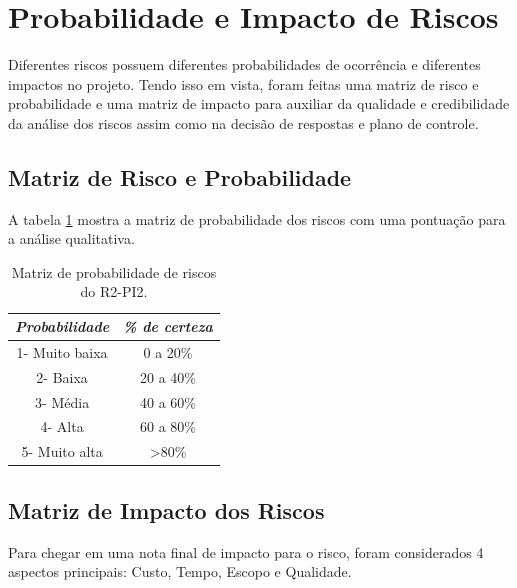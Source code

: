 \section{Probabilidade e Impacto de Riscos} %
 \label{sec:probabilidade_e_impacto_de_riscos}
 
 Diferentes riscos possuem diferentes probabilidades de ocorrência e diferentes impactos no projeto. Tendo isso em vista, foram feitas uma matriz de risco e probabilidade e uma matriz de impacto para auxiliar da qualidade e credibilidade da análise dos riscos assim como na decisão de respostas e plano de controle.

 \subsection{Matriz de Risco e Probabilidade} %
 \label{sub:matriz_de_risco_e_probabilidade}

 A tabela \ref{tab:probabilidade} mostra a matriz de probabilidade dos riscos com uma pontuação para a análise qualitativa.

 \begin{table}[H]
	\centering
	\caption{Matriz de probabilidade de riscos do R2-PI2.}
	\label{tab:probabilidade}
	\begin{tabular}{|c|c|}
		\hline
		\rowcolor[HTML]{C0C0C0} 
		\textit{\textbf{Probabilidade}} & \textit{\textbf{\% de certeza}} \\ \hline
		1- Muito baixa                  & 0 a 20\%                        \\ \hline
		2- Baixa                        & 20 a 40\%                       \\ \hline
		3- Média                        & 40 a 60\%                       \\ \hline
		4- Alta                         & 60 a 80\%                       \\ \hline
		5- Muito alta                   & \textgreater80\%                \\ \hline
	\end{tabular}
\end{table}
 
 \subsection{Matriz de Impacto dos Riscos} %
 \label{sub:matriz_de_impacto_dos_riscos}
 
 Para chegar em uma nota final de impacto para o risco, foram considerados 4 aspectos principais: Custo, Tempo, Escopo e Qualidade.

